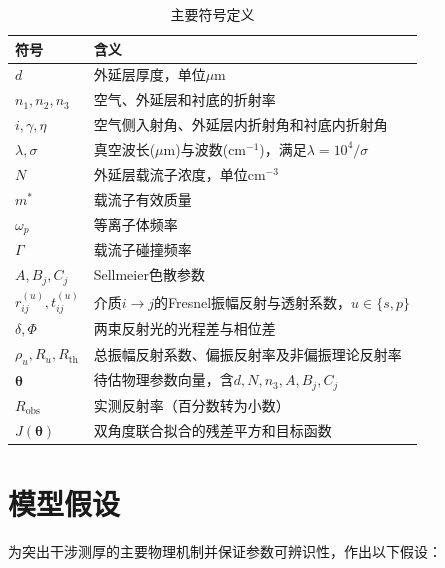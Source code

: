 \documentclass[12pt,a4paper]{ctexart}
\begin{document}
	\begin{table}[htbp]
		\centering
		\caption{主要符号定义}
		\label{tab:symbols}
		\renewcommand{\arraystretch}{1.3}
		\normalsize
		\begin{tabularx}{0.97\textwidth}{>{\centering\arraybackslash}p{3.8cm}>{\centering\arraybackslash}X}
			\toprule
			\rowcolor{cyan!20}\bfseries
			\textbf{符号} & \textbf{含义} \\
			\midrule
			$d$ & 外延层厚度，单位$\mu\mathrm{m}$ \\
			$n_1,n_2,n_3$ & 空气、外延层和衬底的折射率 \\
			$i,\gamma,\eta$ & 空气侧入射角、外延层内折射角和衬底内折射角 \\
			$\lambda,\sigma$ & 真空波长($\mu\mathrm{m}$)与波数($\mathrm{cm^{-1}}$)，满足$\lambda=10^4/\sigma$ \\
			$N$ & 外延层载流子浓度，单位$\mathrm{cm^{-3}}$ \\
			$m^*$ & 载流子有效质量 \\
			$\omega_p$ & 等离子体频率 \\
			$\Gamma$ & 载流子碰撞频率 \\
			$A,B_j,C_j$ & Sellmeier色散参数 \\
			$r_{ij}^{(u)},t_{ij}^{(u)}$ & 介质$i\to j$的Fresnel振幅反射与透射系数，$u\in\{s,p\}$ \\
			$\delta,\Phi$ & 两束反射光的光程差与相位差 \\
			$\rho_u,R_u,R_{\mathrm{th}}$ & 总振幅反射系数、偏振反射率及非偏振理论反射率 \\
			$\boldsymbol\theta$ & 待估物理参数向量，含$d,N,n_3,A,B_j,C_j$ \\
			$R_{\mathrm{obs}}$ & 实测反射率（百分数转为小数） \\
			$J(\boldsymbol\theta)$ & 双角度联合拟合的残差平方和目标函数 \\
			\bottomrule
		\end{tabularx}
	\end{table}
	
	\section{模型假设}
	为突出干涉测厚的主要物理机制并保证参数可辨识性，作出以下假设：
	
\end{document}
